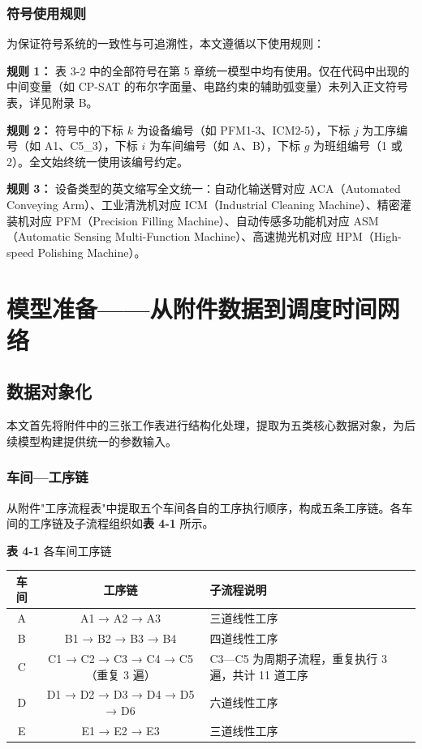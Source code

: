 \documentclass[UTF8,a4paper,12pt]{ctexart}
\begin{document}
\subsubsection{符号使用规则}
为保证符号系统的一致性与可追溯性，本文遵循以下使用规则：

\textbf{规则 1：} 表 3-2 中的全部符号在第 5 章统一模型中均有使用。仅在代码中出现的中间变量（如 CP-SAT 的布尔字面量、电路约束的辅助弧变量）未列入正文符号表，详见附录 B。

\textbf{规则 2：} 符号中的下标 $k$ 为设备编号（如 PFM1-3、ICM2-5），下标 $j$ 为工序编号（如 A1、C5_3），下标 $i$ 为车间编号（如 A、B），下标 $g$ 为班组编号（1 或 2）。全文始终统一使用该编号约定。

\textbf{规则 3：} 设备类型的英文缩写全文统一：自动化输送臂对应 ACA（Automated Conveying Arm）、工业清洗机对应 ICM（Industrial Cleaning Machine）、精密灌装机对应 PFM（Precision Filling Machine）、自动传感多功能机对应 ASM（Automatic Sensing Multi-Function Machine）、高速抛光机对应 HPM（High-speed Polishing Machine）。


\section{模型准备——从附件数据到调度时间网络}

\subsection{数据对象化}
本文首先将附件中的三张工作表进行结构化处理，提取为五类核心数据对象，为后续模型构建提供统一的参数输入。

\subsubsection{车间—工序链}
从附件"工序流程表"中提取五个车间各自的工序执行顺序，构成五条工序链。各车间的工序链及子流程组织如\textbf{表 4-1} 所示。

\begin{center}
\textbf{表 4-1} 各车间工序链
\begin{tabular}{ccl}
\toprule
车间 & 工序链 & 子流程说明 \\
\midrule
A & A1 → A2 → A3 & 三道线性工序 \\
B & B1 → B2 → B3 → B4 & 四道线性工序 \\
C & C1 → C2 → C3 → C4 → C5（重复 3 遍） & C3—C5 为周期子流程，重复执行 3 遍，共计 11 道工序 \\
D & D1 → D2 → D3 → D4 → D5 → D6 & 六道线性工序 \\
E & E1 → E2 → E3 & 三道线性工序 \\
\bottomrule
\end{tabular}
\end{center}
\end{document}
